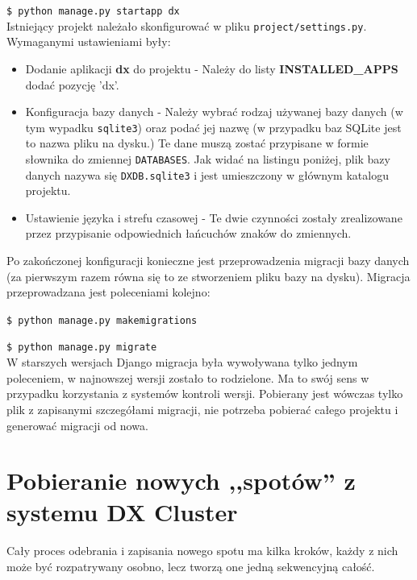 \documentclass[]{mgr}
\begin{document}
        \texttt{\$ python manage.py startapp dx}\\

        \noindent Istniejący projekt należało skonfigurować w pliku \texttt{project/settings.py}. Wymaganymi ustawieniami były:
        \begin{itemize}
            \item Dodanie aplikacji \textbf{dx} do projektu - Należy do listy \mbox{\textbf{INSTALLED\_APPS}} dodać pozycję 'dx'.
            \clearpage
            \item Konfiguracja bazy danych - Należy wybrać rodzaj używanej bazy danych (w tym wypadku \texttt{sqlite3}) oraz podać jej nazwę (w przypadku baz SQLite jest to nazwa pliku na dysku.) Te dane muszą zostać przypisane w formie słownika do zmiennej \texttt{DATABASES}. Jak widać na listingu poniżej, plik bazy danych nazywa się \texttt{DXDB.sqlite3} i jest umieszczony w głównym katalogu projektu.
            
            \item Ustawienie języka i strefu czasowej - Te dwie czynności zostały zrealizowane przez przypisanie odpowiednich łańcuchów znaków do zmiennych.
            
        \end{itemize}

        \noindent Po zakończonej konfiguracji konieczne jest przeprowadzenia migracji bazy danych (za pierwszym razem równa się to ze stworzeniem pliku bazy na dysku). Migracja przeprowadzana jest poleceniami kolejno:

        \texttt{\$ python manage.py makemigrations}

        \texttt{\$ python manage.py migrate}\\

        W starszych wersjach Django migracja była wywoływana tylko jednym poleceniem, w najnowszej wersji zostało to rodzielone. Ma to swój sens w przypadku korzystania z systemów kontroli wersji. Pobierany jest wówczas tylko plik z zapisanymi szczegółami migracji, nie potrzeba pobierać całego projektu i generować migracji od nowa.

        \section{Pobieranie nowych ,,spotów'' z systemu DX Cluster}
        Cały proces odebrania i zapisania nowego spotu ma kilka kroków, każdy z nich może być rozpatrywany osobno, lecz tworzą one jedną sekwencyjną całość.
\end{document}

